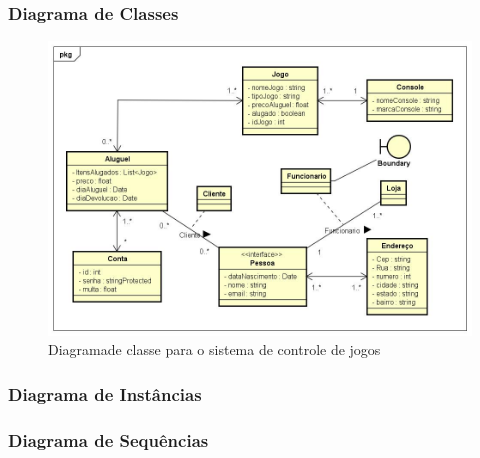 \documentclass[a4paper,10pt]{article}
\begin{document}
\subsubsection{Diagrama de Classes}

\begin{figure}%
\center
\includegraphics[width=.7\columnwidth]{SistemaDeControleDeLocadoraDeJogos/UML/ClassDiagram.jpg}%
\caption{Diagramade classe para o sistema de controle de jogos}%
\label{fig:Jogo:classDeUso}%
\end{figure}


\subsubsection{Diagrama de Instâncias}
\subsubsection{Diagrama de Sequências}



 
\end{document}
